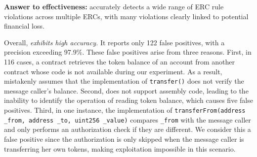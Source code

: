 \begin{tcolorbox}[size=title]
{\textbf{Answer to effectiveness:} 
\Tool{} accurately detects a wide range of ERC rule violations across multiple ERCs, with many violations clearly linked to potential financial loss.}
\end{tcolorbox}



Overall, \textit{\emph{\Tool{}} exhibits high accuracy.}
It reports only 122 false positives, 
with a precision exceeding 97.9\%. %
These false positives arise from three reasons.
First, in 116 cases, a contract retrieves the token balance 
of an account from another contract whose code is not 
available during our experiment. As a result, \Tool{} 
mistakenly assumes that the implementation of \texttt{transfer()} does not verify the message caller's 
balance.
Second, \Tool{} does not support assembly code, leading to 
the inability to identify the operation of reading token balance, 
which causes five false positives.
Third, in one instance, the implementation of 
\texttt{transferFrom(address \_from, address \_to, uint256 \_value)} compares \texttt{\_from} with the message caller 
and only performs an authorization check if they are 
different. We consider this a false positive since the
authorization is only skipped when the message caller is transferring her own tokens, making exploitation 
impossible in this scenario.

\fi
